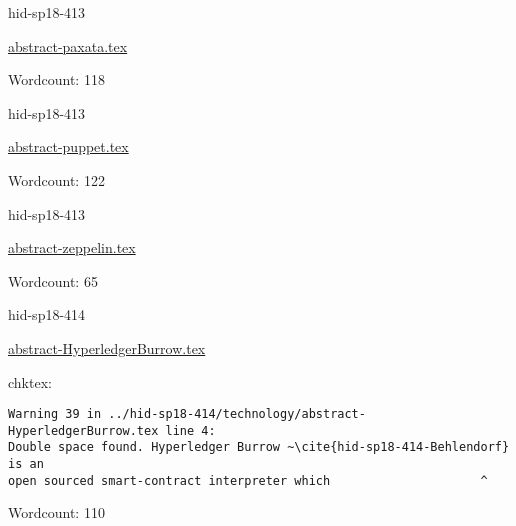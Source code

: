 

\begin{IU}

hid-sp18-413

\href{https://github.com/cloudmesh-community/hid-sp18-413/blob/master//technology/abstract-paxata.tex}{abstract-paxata.tex}

 

Wordcount: 118

\end{IU}



\begin{IU}

hid-sp18-413

\href{https://github.com/cloudmesh-community/hid-sp18-413/blob/master//technology/abstract-puppet.tex}{abstract-puppet.tex}

 

Wordcount: 122

\end{IU}



\begin{IU}

hid-sp18-413

\href{https://github.com/cloudmesh-community/hid-sp18-413/blob/master//technology/abstract-zeppelin.tex}{abstract-zeppelin.tex}

 

Wordcount: 65

\end{IU}



\begin{IU}

hid-sp18-414

\href{https://github.com/cloudmesh-community/hid-sp18-414/blob/master//technology/abstract-HyperledgerBurrow.tex}{abstract-HyperledgerBurrow.tex}

 
chktex:
\begin{tiny}
\begin{verbatim}
Warning 39 in ../hid-sp18-414/technology/abstract-HyperledgerBurrow.tex line 4:
Double space found. Hyperledger Burrow ~\cite{hid-sp18-414-Behlendorf} is an
open sourced smart-contract interpreter which                     ^
\end{verbatim}
\end{tiny}

Wordcount: 110

\end{IU}

